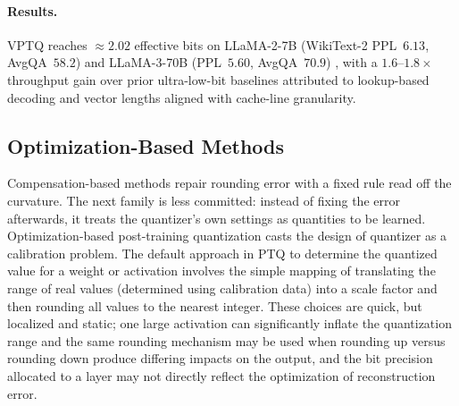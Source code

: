 
\paragraph{Results.}
VPTQ reaches ${\approx}2.02$ effective bits on LLaMA-2-7B (WikiText-2 PPL~$6.13$, AvgQA~$58.2$) and LLaMA-3-70B (PPL~$5.60$, AvgQA~$70.9$) \cite{liu2024vptq}, with a $1.6$--$1.8\times$ throughput gain over prior ultra-low-bit baselines attributed to lookup-based decoding and vector lengths aligned with cache-line granularity.

\subsection{Optimization-Based Methods}

Compensation-based methods repair rounding error with a fixed rule read off the curvature. The next family is less committed: instead of fixing the error afterwards, it treats the quantizer's own settings as quantities to be learned. Optimization-based post-training quantization casts the design of quantizer as a calibration problem. The default approach in PTQ to determine the quantized value for a weight or activation involves the simple mapping of translating the range of real values (determined using calibration data) into a scale factor and then rounding all values to the nearest integer. These choices are quick, but localized and static; one large activation can significantly inflate the quantization range and the same rounding mechanism may be used when rounding up versus rounding down produce differing impacts on the output, and the bit precision allocated to a layer may not directly reflect the optimization of reconstruction error.

